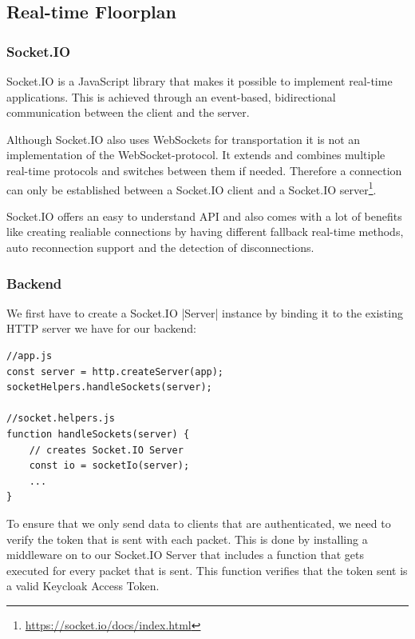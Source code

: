 \subsection{Real-time Floorplan}
\label{Real-time Floorplan}

\subsubsection{Socket.IO}
\label{Socket.IO}

Socket.IO is a JavaScript library that makes it possible to implement real-time applications. This is achieved through an event-based, bidirectional communication between the client and the server. 

Although Socket.IO also uses WebSockets for transportation it is not an implementation of the WebSocket-protocol. It extends and combines multiple real-time protocols and switches between them if needed. Therefore a connection can only be established between a Socket.IO client and a Socket.IO server\footnote{\url{https://socket.io/docs/index.html}}.

Socket.IO offers an easy to understand API and also comes with a lot of benefits like creating realiable connections by having different fallback real-time methods, auto reconnection support and the detection of disconnections.

\subsubsection{Backend}
\label{Backend}

We first have to create a Socket.IO |Server|\cite{socketio:server} instance by binding it to the existing HTTP server we have for our backend:

\begin{lstlisting}[label=createSocketIOServer]
//app.js
const server = http.createServer(app);
socketHelpers.handleSockets(server);

//socket.helpers.js
function handleSockets(server) {
	// creates Socket.IO Server
    const io = socketIo(server);
    ...
}
\end{lstlisting}

To ensure that we only send data to clients that are authenticated, we need to verify the token that is sent with each packet. This is done by installing a middleware on to our Socket.IO Server that includes a function that gets executed for every packet that is sent. This function verifies that the token sent is a valid Keycloak Access Token.

